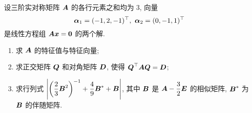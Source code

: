 \begin{example}[2010 武汉大学]
    设三阶实对称矩阵 $\vb*{A}$ 的各行元素之和均为 3, 向量
    $$\vb*{\alpha}_1=(-1,2,-1)^{\top},~\vb*{\alpha}_2=(0,-1,1)^{\top}$$ 是线性方程组 $\vb*{Ax}=\vb*{0}$ 的两个解.
    \begin{enumerate}[label=(\arabic{*})]
        \item 求 $\vb*{A}$ 的特征值与特征向量;
        \item 求正交矩阵 $\vb*{Q}$ 和对角矩阵 $\vb*{D}$, 使得 $\vb*{Q}^{\top}\vb*{AQ}=\vb*{D}$;
        \item 求行列式 $\qty|\qty(\dfrac{2}{3}\vb*{B}^2)^{-1}+\dfrac{4}{9}\vb*{B}^*+\vb*{B}|$, 其中 $\vb*{B}$ 是 $\vb*{A}-\dfrac{3}{2}\vb*{E}$ 的相似矩阵, $\vb*{B}^*$ 为 $\vb*{B}$ 的伴随矩阵.
    \end{enumerate}
\end{example}
